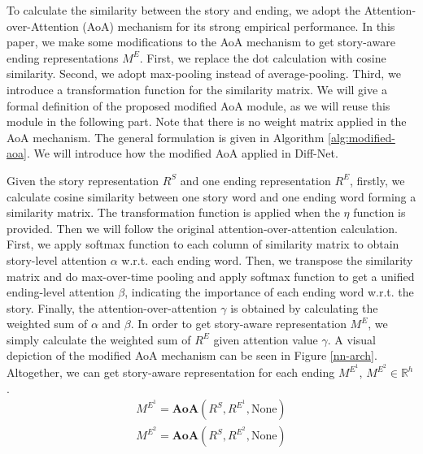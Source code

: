 \documentclass[letterpaper]{article} %
\begin{document}
To calculate the similarity between the story and ending, we adopt the Attention-over-Attention (AoA) mechanism \cite{cui-acl2017-aoa} for its strong empirical performance.
In this paper, we make some modifications to the AoA mechanism to get story-aware ending representations $M^E$.
First, we replace the dot calculation with cosine similarity.
Second, we adopt max-pooling instead of average-pooling.
Third, we introduce a transformation function for the similarity matrix.
We will give a formal definition of the proposed modified AoA module, as we will reuse this module in the following part.
Note that there is no weight matrix applied in the AoA mechanism.
The general formulation is given in Algorithm \ref{alg:modified-aoa}.
We will introduce how the modified AoA applied in Diff-Net.

Given the story representation $R^S$ and one ending representation $R^E$, firstly, we calculate cosine similarity between one story word and one ending word forming a similarity matrix.
The transformation function is applied when the $\eta$ function is provided.
Then we will follow the original attention-over-attention calculation. First, we apply softmax function to each column of similarity matrix to obtain story-level attention $\alpha$ w.r.t. each ending word. Then, we transpose the similarity matrix and do max-over-time pooling and apply softmax function to get a unified ending-level attention $\beta$, indicating the importance of each ending word w.r.t. the story. Finally, the attention-over-attention $\gamma$ is obtained by calculating the weighted sum of $\alpha$ and $\beta$. In order to get story-aware representation $M^E$, we simply calculate the weighted sum of $R^E$ given attention value $\gamma$.
A visual depiction of the modified AoA mechanism can be seen in Figure \ref{nn-arch}.
Altogether, we can get story-aware representation for each ending $M^{E^1}$, $M^{E^2}  \in \mathbb{R}^{h}$.
\begin{gather}
M^{E^1} = \mathbf{AoA}(R^S, R^{E^1}, \text{None})  \\
M^{E^2} = \mathbf{AoA}(R^S, R^{E^2}, \text{None})
\end{gather}


\renewcommand{\algorithmicrequire}{\textbf{Input:}}
\renewcommand{\algorithmicensure}{\textbf{Output:}}
\end{document}
